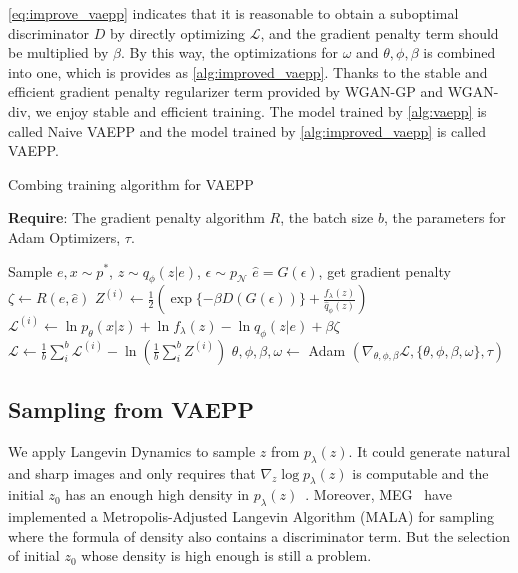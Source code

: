 \cref{eq:improve_vaepp} indicates that it is reasonable to obtain a suboptimal discriminator $D$ by directly optimizing $\mathcal{L}$, and the gradient penalty term should be multiplied by $\beta$. By this way, the optimizations for $\omega$ and $\theta, \phi, \beta$ is combined into one, which is provides as \cref{alg:improved_vaepp}. 
Thanks to the stable and efficient gradient penalty regularizer term provided by WGAN-GP and WGAN-div, we enjoy stable and efficient training. The model trained by \cref{alg:vaepp} is called Naive VAEPP and the model trained by \cref{alg:improved_vaepp} is called VAEPP. 
\begin{algorithm}[tb]
\caption{Combing training algorithm for VAEPP}
\label{alg:improved_vaepp}
\textbf{Require}: The gradient penalty algorithm $R$, the batch size $b$, the parameters for Adam Optimizers, $\tau$. 

\begin{algorithmic}[1] %
\STATE Sample $e, x \sim p^*$, $z \sim q_\phi(z|e)$, $\epsilon \sim p_\mathcal{N}$
\STATE $\hat{e} = G(\epsilon)$, get gradient penalty $\zeta \gets R(e, \hat{e})$ 
\STATE $Z^{(i)} \gets \frac{1}{2}(\exp\{-\beta D(G(\epsilon))\} + \frac{f_\lambda(z)}{\hat{q}_\phi(z)})$
\STATE $\mathcal{L}^{(i)} \gets \ln p_\theta(x|z) + \ln f_\lambda(z) - \ln q_\phi(z|e) + \beta \zeta$
\ENDFOR
\STATE $\mathcal{L} \gets \frac{1}{b}\sum_{i}^b \mathcal{L}^{(i)} - \ln (\frac{1}{b}\sum_{i}^b Z^{(i)})$
\STATE $\theta, \phi, \beta, \omega \gets $ Adam $(\nabla_{\theta, \phi, \beta} \mathcal{L}, \{\theta, \phi, \beta, \omega\}, \tau)$
\ENDWHILE
\end{algorithmic}
\end{algorithm}

\subsection{Sampling from VAEPP}
We apply Langevin Dynamics to sample $z$ from $p_\lambda(z)$. It could generate natural and sharp images and only requires that $\nabla_z \log p_\lambda(z)$ is computable and the initial $z_0$ has an enough high density in $p_\lambda(z)$~\cite{song2019generative}. 
Moreover, MEG~\cite{kumar2019maximum} have implemented a Metropolis-Adjusted Langevin Algorithm (MALA) for sampling where the formula of density also contains a discriminator term. But the selection of initial $z_0$ whose density is high enough is still a problem. 

